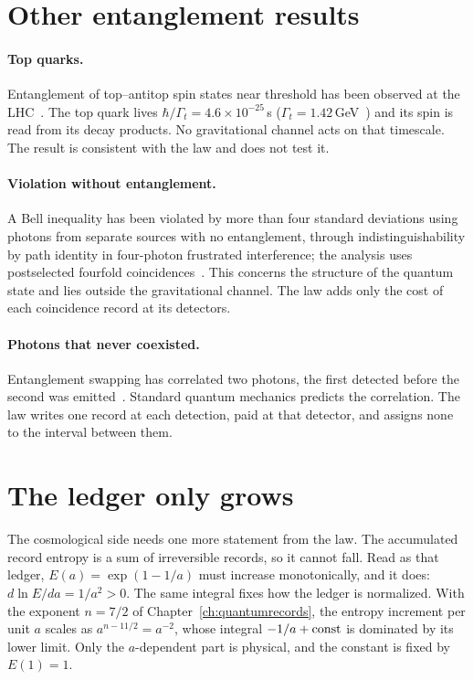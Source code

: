 \section{Other entanglement results}\label{sec:ent:other}
\paragraph{Top quarks.} Entanglement of top--antitop spin states near threshold has been observed at the LHC~\cite{ATLAS2024TopEnt,CMS2024TopEnt}.
\observed{} The top quark lives $\hbar/\Gamma_t=4.6\times10^{-25}$\,s ($\Gamma_t=1.42$\,GeV~\cite{PDG2022}) and its spin is read from its decay
products. \calc{} No gravitational channel acts on that timescale. The result is consistent with the law and does not test it.

\paragraph{Violation without entanglement.} A Bell inequality has been violated by more than four standard deviations using photons from separate
sources with no entanglement, through indistinguishability by path identity in four-photon frustrated interference; the analysis uses postselected
fourfold coincidences~\cite{Wang2025SciAdv}. \observed{} This concerns the structure of the quantum state and lies outside the gravitational channel.
The law adds only the cost of each coincidence record at its detectors.

\paragraph{Photons that never coexisted.} Entanglement swapping has correlated two photons, the first detected before the second was
emitted~\cite{Megidish2013}. \observed{} Standard quantum mechanics predicts the correlation. The law writes one record at each detection, paid at that
detector, and assigns none to the interval between them.

\section{The ledger only grows}\label{sec:ent:ledger}
The cosmological side needs one more statement from the law. The accumulated record entropy is a sum of irreversible records, so it cannot fall.
Read as that ledger, $E(a)=\exp(1-1/a)$ must increase monotonically, and it does: $d\ln E/da=1/a^2>0$. \derived{} The same integral fixes how the
ledger is normalized. With the exponent $n=7/2$ of Chapter~\ref{ch:quantumrecords}, the entropy increment per unit $a$ scales as $a^{n-11/2}=a^{-2}$,
whose integral $-1/a+{\rm const}$ is dominated by its lower limit. Only the $a$-dependent part is physical, and the constant is fixed by $E(1)=1$.
\calc


